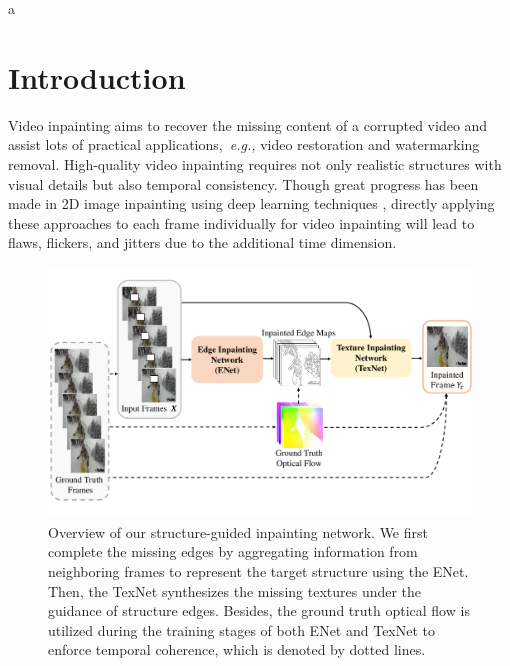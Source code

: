 a

\section{Introduction}


Video inpainting aims to recover the missing content of a corrupted video and assist lots of practical applications,~\emph{e.g.,} video restoration and watermarking removal. 
High-quality video inpainting requires not only realistic structures with visual details but also temporal consistency. 
% 
Though great progress has been made in 2D image inpainting using deep learning techniques \cite{yu2018free,Xiong_2019_CVPR}, directly applying these approaches to each frame individually for video inpainting will lead to flaws, flickers, and jitters due to the additional time dimension. 

\begin{figure}[t]
	\centering
	\includegraphics[width=1.01\columnwidth]{zong} %
	\caption{Overview of our structure-guided inpainting network. We first complete the missing edges by aggregating information from neighboring frames to represent the target structure using the ENet. Then, the TexNet synthesizes the missing textures under the guidance of structure edges. Besides, the ground truth optical flow is utilized during the training stages of both ENet and TexNet to enforce temporal coherence, which is denoted by dotted lines.}
	\label{zong}
\end{figure}



